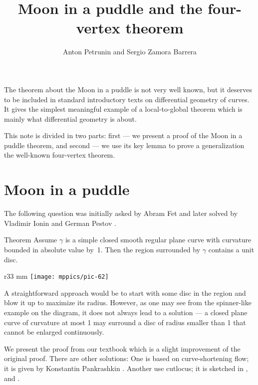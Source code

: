 \documentclass{article}
\begin{document}


\title{Moon in a puddle and the four-vertex theorem}
\author{Anton Petrunin and Sergio Zamora Barrera}
\date{}
\maketitle


The theorem about the Moon in a puddle is not very well known, but it deserves to be included in standard introductory texts on differential geometry of curves.
It gives the simplest meaningful example of a local-to-global theorem which is mainly what differential geometry is about.

This note is divided in two parts:  first --- we present a proof of the Moon in a puddle theorem, and second --- we use its key lemma to prove a generalization the well-known four-vertex theorem.


\section*{Moon in a puddle}

The following question was initially asked by Abram Fet and later solved by Vladimir Ionin and German Pestov \cite{pestov-ionin}.

\begin{thm}{Theorem}\label{thm:moon-orginal}
Assume $\gamma$ is a simple closed smooth regular plane curve with curvature bounded in absolute value by~1.
Then the region surrounded by $\gamma$ contains a unit disc.
\end{thm}


{

\begin{wrapfigure}{r}{33 mm}
\vskip-6mm
\centering
\texttt{[image: mppics/pic-62]}
\vskip0mm
\end{wrapfigure}

A straightforward approach would be to start with some disc in the region and blow it up to maximize its radius.
However, as one may see from the spinner-like example on the diagram, it does not always lead to a solution --- a closed plane curve of curvature at most 1 may surround a disc of radius smaller than 1 that cannot be enlarged continuously.

}

We present the proof from our textbook \cite{petrunin-zamora} which is a slight improvement of the original proof.
There are other solutions: 
One is based on curve-shortening flow; it is given by Konstantin Pankrashkin  \cite{pankrashkin}.
Another use cutlocus; it is sketched in \cite{petrunin-2020,panov-petrunin}, and \cite[Problem 1.7.19]{toponogov}.
\end{document}
